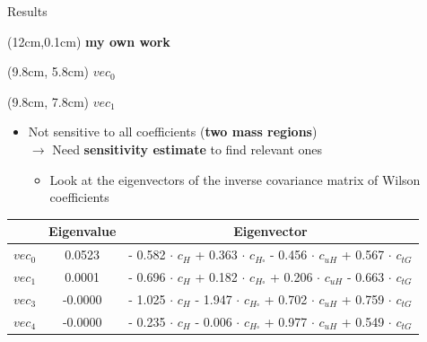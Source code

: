 \begin{frame}{Results}
\begin{textblock*}{5cm}(12cm,0.1cm) %
   \textcolor{HHred}{\Large\textbf{my own work}}
\end{textblock*}

\begin{textblock*}{5cm}(9.8cm, 5.8cm) %
     $vec_{0}$
\end{textblock*}
\begin{textblock*}{5cm}(9.8cm, 7.8cm) %
     $vec_{1}$
\end{textblock*}



\begin{itemize}
    \item Not sensitive to all coefficients (\textbf{two mass regions}) \\
    $\to$ Need \textcolor{HHred}{\textbf{sensitivity estimate}} to find relevant ones
    \begin{itemize}
        \item Look at the eigenvectors of the inverse covariance matrix of Wilson coefficients
    \end{itemize}
\end{itemize}
\begin{table}[]
    \centering
    \begin{tabular}{lcc}
    \hline\hline
    & Eigenvalue & Eigenvector \\
    \hline
  $vec_{0}$ & \textcolor{HHred}{0.0523}  &  - 0.582 $\cdot$ $c_{H}$ + 0.363 $\cdot$ $c_{H\square}$ - 0.456 $\cdot$ $c_{uH}$ + 0.567 $\cdot$ $c_{tG}$ \\ \hline
  $vec_{1}$ &  \textcolor{HHred}{0.0001}  &  - 0.696 $\cdot$ $c_{H}$ + 0.182 $\cdot$ $c_{H\square}$ + 0.206 $\cdot$ $c_{uH}$ - 0.663 $\cdot$ $c_{tG}$ \\ \hline
  $vec_{3}$ & -0.0000 &  - 1.025 $\cdot$ $c_{H}$ - 1.947 $\cdot$ $c_{H\square}$ + 0.702 $\cdot$ $c_{uH}$ + 0.759 $\cdot$ $c_{tG}$ \\ \hline
  $vec_{4}$ & -0.0000 &  - 0.235 $\cdot$ $c_{H}$ - 0.006 $\cdot$ $c_{H\square}$ + 0.977 $\cdot$ $c_{uH}$ + 0.549 $\cdot$ $c_{tG}$ \\ \hline
   \hline
    \end{tabular}
\end{table}


\end{frame}
